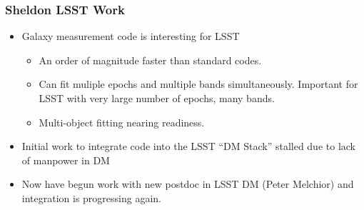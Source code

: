 \documentclass{beamer}
\begin{document}
\frame
{

    \frametitle{Sheldon LSST Work}
    \begin{itemize}
        \item Galaxy measurement code is interesting for LSST
            \begin{itemize}

                \item An order of magnitude faster than standard codes.

                \item Can fit muliple epochs and multiple bands simultaneously.  Important
                    for LSST with very large number of epochs, many bands.

                \item Multi-object fitting nearing readiness.

            \end{itemize}

        \item Initial work to integrate code into the LSST ``DM Stack'' stalled
            due to lack of manpower in DM

        \item Now have begun work with new postdoc in LSST DM (Peter Melchior) and
            integration is progressing again.

    \end{itemize}
}
\end{document}

